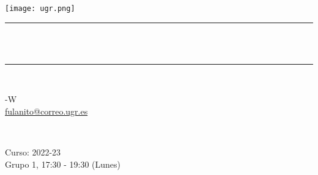 \begin{titlepage}
	\centering
	\texttt{[image: ugr.png]}\\[1.0 cm]
	\rule{\linewidth}{0.2 mm} \\[0.4 cm]
	{ \huge \bfseries \thetitle}\\
	\rule{\linewidth}{0.2 mm} \\[1.5 cm]
	
	\begin{minipage}{0.5\textwidth}
		\begin{flushleft} \large
			-W \\
			\href{mailto:fulanito@correo.ugr.es}{fulanito@correo.ugr.es}
		\end{flushleft}
	\end{minipage}~
	\begin{minipage}{0.5\textwidth}
		\begin{flushright} \large
			Curso: 2022-23 \\
			Grupo 1, 17:30 - 19:30 (Lunes)                   
		\end{flushright}
	\end{minipage}\\[1 cm]
	
	{\small \thedate}\\[1 cm]
	
	\vfill
	
\end{titlepage}
